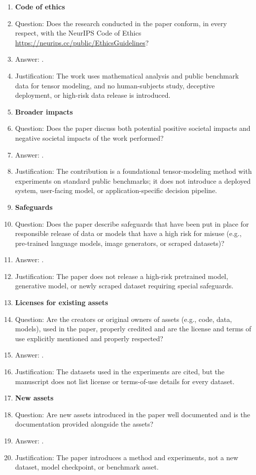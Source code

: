 \begin{enumerate}
\item {\bf Code of ethics}
    \item[] Question: Does the research conducted in the paper conform, in every respect, with the NeurIPS Code of Ethics \url{https://neurips.cc/public/EthicsGuidelines}?
    \item[] Answer: \answerYes{}.
    \item[] Justification: The work uses mathematical analysis and public benchmark data for tensor modeling, and no human-subjects study, deceptive deployment, or high-risk data release is introduced.

\item {\bf Broader impacts}
    \item[] Question: Does the paper discuss both potential positive societal impacts and negative societal impacts of the work performed?
    \item[] Answer: \answerNA{}.
    \item[] Justification: The contribution is a foundational tensor-modeling method with experiments on standard public benchmarks; it does not introduce a deployed system, user-facing model, or application-specific decision pipeline.

\item {\bf Safeguards}
    \item[] Question: Does the paper describe safeguards that have been put in place for responsible release of data or models that have a high risk for misuse (e.g., pre-trained language models, image generators, or scraped datasets)?
    \item[] Answer: \answerNA{}.
    \item[] Justification: The paper does not release a high-risk pretrained model, generative model, or newly scraped dataset requiring special safeguards.

\item {\bf Licenses for existing assets}
    \item[] Question: Are the creators or original owners of assets (e.g., code, data, models), used in the paper, properly credited and are the license and terms of use explicitly mentioned and properly respected?
    \item[] Answer: \answerNo{}.
    \item[] Justification: The datasets used in the experiments are cited, but the manuscript does not list license or terms-of-use details for every dataset.

\item {\bf New assets}
    \item[] Question: Are new assets introduced in the paper well documented and is the documentation provided alongside the assets?
    \item[] Answer: \answerNA{}.
    \item[] Justification: The paper introduces a method and experiments, not a new dataset, model checkpoint, or benchmark asset.


\end{enumerate}
